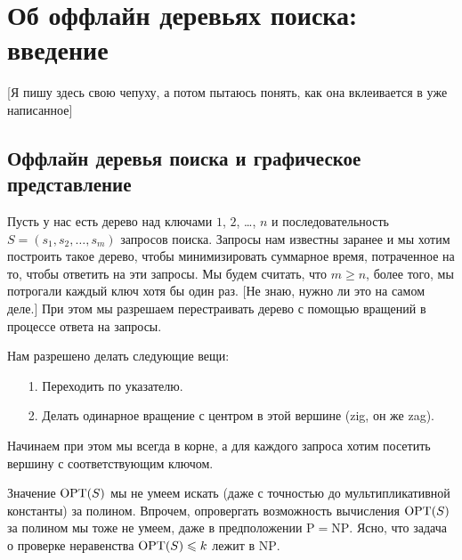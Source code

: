 \section{Об оффлайн деревьях поиска: введение}

[Я пишу здесь свою чепуху, а потом пытаюсь понять, как она вклеивается в уже написанное]

\subsection{Оффлайн деревья поиска и графическое представление}

Пусть у нас есть дерево над ключами $1$, $2$, \ldots, $n$ и последовательность $S = (s_1, s_2, \ldots, s_m)$ запросов поиска. Запросы нам известны заранее и мы хотим построить такое дерево, чтобы минимизировать суммарное время, потраченное на то, чтобы ответить на эти запросы. Мы будем считать, что $m \geqslant n$, более того, мы потрогали каждый ключ хотя бы один раз. [Не знаю, нужно ли это на самом деле.]
При этом мы разрешаем перестраивать дерево с помощью вращений в процессе 
ответа на запросы.

Нам разрешено делать следующие вещи:
\begin{itemize}
\item[1.] Переходить по указателю.
\item[2.] Делать одинарное вращение с центром в этой вершине (zig, он же zag).
\end{itemize}

Начинаем при этом мы всегда в корне, а для каждого запроса хотим посетить вершину
с соответствующим ключом.




Значение 
$\operatorname{OPT}(S)$ мы не умеем искать (даже с точностью до мультипликативной
константы) за полином. Впрочем, опровергать возможность вычисления $\operatorname{OPT}(S)$ 
за полином мы тоже не умеем, даже в предположении $\mathrm{P} = \mathrm{NP}$. Ясно,
что задача о проверке неравенства $\operatorname{OPT}(S) \leqslant k$ лежит в $\mathrm{NP}$.

